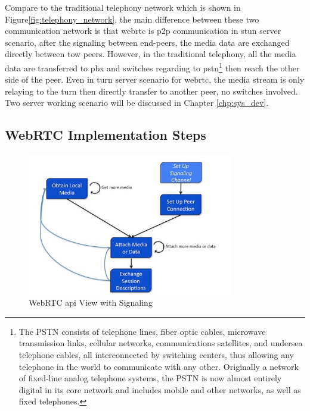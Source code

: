 \par Compare to the traditional telephony network which is shown in Figure\ref{fig:telephony_network}\cite{web:teleVSvoip}, the main difference between these two communication network is that \gls{webrtc} is \gls{p2p} communication in \gls{stun} server scenario, after the signaling between end-peers, the media data are exchanged directly between tow peers. However, in the traditional telephony, all the media data are transferred to \gls{pbx} and switches regarding to \gls{pstn}\footnote{The PSTN consists of telephone lines, fiber optic cables, microwave transmission links, cellular networks, communications satellites, and undersea telephone cables, all interconnected by switching centers, thus allowing any telephone in the world to communicate with any other. Originally a network of fixed-line analog telephone systems, the PSTN is now almost entirely digital in its core network and includes mobile and other networks, as well as fixed telephones.\cite{wiki:pstn}} then reach the other side of the peer. Even in \gls{turn} server scenario for \gls{webrtc}, the media stream is only relaying to the \gls{turn} then directly transfer to another peer, no switches involved. Two server working scenario will be discussed in Chapter \ref{chp:sys_dev}.

\subsection{WebRTC Implementation Steps}

\begin{figure}
	\centering
    	\includegraphics[width=0.80\textwidth,natwidth=610,natheight=642]{figs/webrtcApis.png}
  	\caption{WebRTC \gls{api} View with Signaling\cite{inbook:rtc-apis}}
  	\label{fig:webrtc_4steps}
\end{figure}

